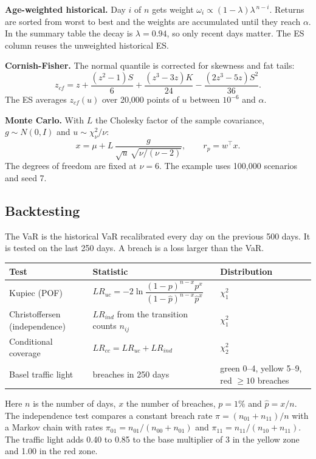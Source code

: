 \documentclass[11pt,a4paper]{article}
\begin{document}
\textbf{Age-weighted historical.} Day $i$ of $n$ gets weight $\omega_i\propto(1-\lambda)\lambda^{\,n-i}$. Returns are sorted from worst to best and the weights are accumulated until they reach $\alpha$. In the summary table the decay is $\lambda=0.94$, so only recent days matter. The ES column reuses the unweighted historical ES.

\textbf{Cornish-Fisher.} The normal quantile is corrected for skewness and fat tails:
\[
z_{cf}=z+\frac{(z^2-1)S}{6}+\frac{(z^3-3z)K}{24}-\frac{(2z^3-5z)S^2}{36}.
\]
The ES averages $z_{cf}(u)$ over 20,000 points of $u$ between $10^{-6}$ and $\alpha$.

\textbf{Monte Carlo.} With $L$ the Cholesky factor of the sample covariance, $g\sim N(0,I)$ and $u\sim\chi^2_\nu/\nu$:
\[
x=\mu+L\,\frac{g}{\sqrt{u}\,\sqrt{\nu/(\nu-2)}},\qquad r_p=w^\top x .
\]
The degrees of freedom are fixed at $\nu=6$. The example uses 100,000 scenarios and seed 7.

\subsection{Backtesting}
The VaR is the historical VaR recalibrated every day on the previous 500 days. It is tested on the last 250 days. A breach is a loss larger than the VaR.

\begin{center}
\begin{tabular}{@{}lp{5.3cm}p{3.4cm}@{}}
\toprule
Test & Statistic & Distribution \\
\midrule
Kupiec (POF) & $LR_{uc}=-2\ln\dfrac{(1-p)^{n-x}p^x}{(1-\hat p)^{n-x}\hat p^x}$ & $\chi^2_1$ \\[6pt]
Christoffersen (independence) & $LR_{ind}$ from the transition counts $n_{ij}$ & $\chi^2_1$ \\[2pt]
Conditional coverage & $LR_{cc}=LR_{uc}+LR_{ind}$ & $\chi^2_2$ \\[2pt]
Basel traffic light & breaches in 250 days & green 0--4, yellow 5--9, red $\ge10$ breaches \\
\bottomrule
\end{tabular}
\end{center}
Here $n$ is the number of days, $x$ the number of breaches, $p=1\%$ and $\hat p=x/n$. The independence test compares a constant breach rate $\pi=(n_{01}+n_{11})/n$ with a Markov chain with rates $\pi_{01}=n_{01}/(n_{00}+n_{01})$ and $\pi_{11}=n_{11}/(n_{10}+n_{11})$. The traffic light adds 0.40 to 0.85 to the base multiplier of 3 in the yellow zone and 1.00 in the red zone.
\end{document}
